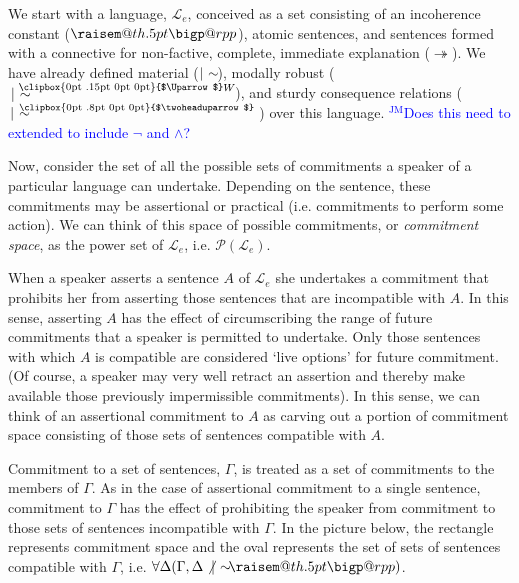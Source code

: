 \documentclass{article}                     %
\makeatletter
\theoremstyle{definition}
\newcommand{\ee}{\twoheadrightarrow}
\newcommand{\raisemath}[1]{\mathpalette{\raisem@th{#1}}}
\newcommand{\raisem@th}[3]{\raisebox{#1}{$#2#3$}}
\newcommand{\Uuparrow}{%
	\raisebox{.2ex}{\clipbox{0pt .15pt 0pt 0pt}{$\Uparrow$}}
}
\newcommand{\thuarrow}{%
	\raisebox{.05ex}{\clipbox{0pt .8pt 0pt 0pt}{$\twoheaduparrow$}}
}
\newcommand{\nms}{%
	\mathbin{\mathpalette\@nms\expandafter}
}
\newcommand{\@nms}{\mid\joinrel\mkern-.5mu\sim}
\newcommand{\nmc}{%
	\mathbin{\mathpalette\nm@\expandafter}
}
\newcommand{\nm@}{\mid\joinrel\mkern-.5mu\sim\mkern-3mu}
\newcommand{\mrc}[1]{\mathbin{
		\mathchoice
		{\normalsize\hspace{.5mm}\nms^{\mkern-19mu\scriptsize\Uuparrow#1}\hspace{-.5mm}}
		{\normalsize\hspace{.5mm}\nms^{\mkern-19mu\scriptsize\Uuparrow#1}\hspace{-.5mm}}
		{\footnotesize\hspace{.5mm}\nms^{\mkern-13.5mu\fontsize{5.5}{0}\Uuparrow#1}}
		{\scriptsize\nms^{\mkern-10mu\tiny\Uuparrow#1}}
	}
}
\newcommand{\smc}{\mathbin{
		\mathchoice
		{\hspace{.4mm}\nms^{\mkern-17mu\scriptsize\thuarrow}\hspace{.6mm}}
		{\hspace{.4mm}\nms^{\mkern-17mu\scriptsize\thuarrow}\hspace{.6mm}}
		{\footnotesize\hspace{.4mm}\nms^{\mkern-11mu\tiny\thuarrow}\hspace{.6mm}}
		{\scriptsize\nms^{\mkern-10mu\tiny\thuarrow}}
	}
}
\newcommand{\bigperpp}{%
	\mathop{\mathpalette\bigp@rpp\relax}%
	\displaylimits
}
\newcommand{\bigp@rpp}[2]{%
	\vcenter{
		\m@th\hbox{\scalebox{\ifx#1\displaystyle1.15\else1.15\fi}{$#1\perp$}}
	}%
}
\newcommand{\bigperp}{\raisemath{.5pt}{\bigperpp}}
\newcommand{\jm}[1]{\textcolor{blue}{$^{\textrm{JM}}${#1}}}
\makeatother
\begin{document}
We start with a language, $ \mathcal{L}_e $, conceived as a set consisting of an incoherence constant ($ \bigperp $), atomic sentences, and sentences formed with a connective for non-factive, complete, immediate explanation ($ \ee $). We have already defined material ($ \nmc $), modally robust ($ \mrc{W} $), and sturdy consequence relations ($ \smc $) over this language. \jm{Does this need to extended to include $ \neg $ and $ \wedge $?}

Now, consider the set of all the possible sets of commitments a speaker of a particular language can undertake. Depending on the sentence, these commitments may be assertional or practical (i.e. commitments to perform some action). We can think of this space of possible commitments, or \textit{commitment space}, as the power set of $ \mathcal{L}_e $, i.e. $\mathcal{P}(\mathcal{L}_e) $. 

When a speaker asserts a sentence $ A $ of $ \mathcal{L}_e $ she undertakes a commitment that prohibits her from asserting those sentences that are incompatible with $ A $. In this sense, asserting $ A $ has the effect of circumscribing the range of future commitments that a speaker is permitted to undertake. Only those sentences with which $A$ is compatible are considered `live options' for future commitment. (Of course, a speaker may very well retract an assertion and thereby make available those previously impermissible commitments). In this sense, we can think of an assertional commitment to $A$ as carving out a portion of commitment space consisting of those sets of sentences compatible with $A$. 

Commitment to a set of sentences, $ \Gamma $, is treated as a set of commitments to the members of $ \Gamma $. As in the case of assertional commitment to a single sentence, commitment to $\Gamma$ has the effect of prohibiting the speaker from commitment to those sets of sentences incompatible with $ \Gamma $. In the picture below, the rectangle represents commitment space and the oval represents the set of sets of sentences compatible with $ \Gamma $, i.e. $ \forall \Delta (\Gamma, \Delta \not\nmc \bigperp ) $. 

\begin{center}
	


\end{center}
\end{document}
